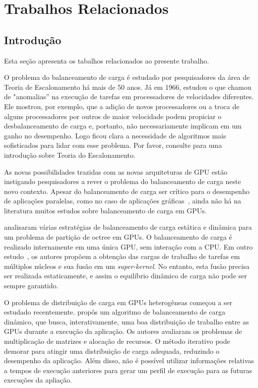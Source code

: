 \pagestyle{empty}
\cleardoublepage
\pagestyle{fancy}
\chapter{Trabalhos Relacionados}\label{cap2}

\section{Introdução}\label{cap2:intro}

Esta seção apresenta os tabalhos relacionados ao presente trabalho.

O problema do balanceamento de carga é estudado por pesquisadores da
área de Teoria de Escalonamento há mais de 50 anos. Já em 1966,
\cite{graham66} estudou o que chamou de "anomalias'' na execução de
tarefas em processadores de velocidades diferentes. Ele mostrou, por
exemplo, que a adição de novos processadores ou a troca de alguns
processadores por outros de maior velocidade podem propiciar o
desbalanceamento de carga e, portanto, não necessariamente implicam em
um ganho no desempenho. Logo ficou clara a necessidade de algoritmos
mais sofisticados para lidar com esse problema. Por favor, consulte
\cite{handbook-sched} para uma introdução sobre Teoria do
Escalonamento.

As novas possibilidades trazidas com as novas arquiteturas de GPU
estão instigando pesquisadores a rever o problema do balanceamento de
carga neste novo contexto.
Apesar do balanceamento de carga ser
crítico para o desempenho de aplicações paralelas, como no caso de
aplicações gráficas~\cite{kdtree, ray}, ainda não há na literatura muitos
estudos sobre balanceamento de carga em GPUs.

\cite{graphics} analisaram várias estratégias de balanceamento de carga estática
e dinâmica para um problema de partição de octree em GPUs. O balanceamento de
carga é realizado internamente em uma única GPU, sem interação com a CPU. Em
outro estudo~\cite{tasks}, os autores propõem a obtenção das cargas de trabalho
de tarefas em múltiplos núcleos e sua fusão em um \textit{super-kernel}. No
entanto, esta fusão precisa ser realizada estaticamente, e assim o equilíbrio
dinâmico de carga não pode ser sempre garantido.

O problema de distribuição de carga em GPUs heterogêneas começou a ser estudado
recentemente. \cite{acosta} propôs um algoritmo de balanceamento de carga
dinâmico, que busca, interativamente, uma boa distribuição de trabalho entre as
GPUs durante a execução da aplicação. Os autores avaliaram os problemas de
multiplicação de matrizes e alocação de recursos. O método iterativo pode
demorar para atingir uma distribuição de carga adequada, reduzindo o desempenho
da aplicação. Além disso, não é possível utilizar informações relativas a tempos
de execução anteriores para gerar um perfil de execução para as futuras
execuções da apliação.

